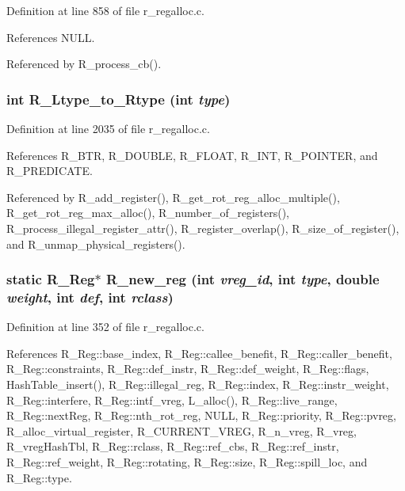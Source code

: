 Definition at line 858 of file r\_\-regalloc.c.

References NULL.

Referenced by R\_\-process\_\-cb().
\subsubsection{\setlength{\rightskip}{0pt plus 5cm}int R\_\-Ltype\_\-to\_\-Rtype (int {\em type})}\label{r__regalloc_8c_d1bd8108e1f3ba8e661eecbaa540e5e5}




Definition at line 2035 of file r\_\-regalloc.c.

References R\_\-BTR, R\_\-DOUBLE, R\_\-FLOAT, R\_\-INT, R\_\-POINTER, and R\_\-PREDICATE.

Referenced by R\_\-add\_\-register(), R\_\-get\_\-rot\_\-reg\_\-alloc\_\-multiple(), R\_\-get\_\-rot\_\-reg\_\-max\_\-alloc(), R\_\-number\_\-of\_\-registers(), R\_\-process\_\-illegal\_\-register\_\-attr(), R\_\-register\_\-overlap(), R\_\-size\_\-of\_\-register(), and R\_\-unmap\_\-physical\_\-registers().
\subsubsection{\setlength{\rightskip}{0pt plus 5cm}static \bf{R\_\-Reg}$\ast$ R\_\-new\_\-reg (int {\em vreg\_\-id}, int {\em type}, double {\em weight}, int {\em def}, int {\em rclass})\hspace{0.3cm}{\tt  [static]}}\label{r__regalloc_8c_90817a62af1db39eb0d14884b42a45de}




Definition at line 352 of file r\_\-regalloc.c.

References R\_\-Reg::base\_\-index, R\_\-Reg::callee\_\-benefit, R\_\-Reg::caller\_\-benefit, R\_\-Reg::constraints, R\_\-Reg::def\_\-instr, R\_\-Reg::def\_\-weight, R\_\-Reg::flags, Hash\-Table\_\-insert(), R\_\-Reg::illegal\_\-reg, R\_\-Reg::index, R\_\-Reg::instr\_\-weight, R\_\-Reg::interfere, R\_\-Reg::intf\_\-vreg, L\_\-alloc(), R\_\-Reg::live\_\-range, R\_\-Reg::next\-Reg, R\_\-Reg::nth\_\-rot\_\-reg, NULL, R\_\-Reg::priority, R\_\-Reg::pvreg, R\_\-alloc\_\-virtual\_\-register, R\_\-CURRENT\_\-VREG, R\_\-n\_\-vreg, R\_\-vreg, R\_\-vreg\-Hash\-Tbl, R\_\-Reg::rclass, R\_\-Reg::ref\_\-cbs, R\_\-Reg::ref\_\-instr, R\_\-Reg::ref\_\-weight, R\_\-Reg::rotating, R\_\-Reg::size, R\_\-Reg::spill\_\-loc, and R\_\-Reg::type.


